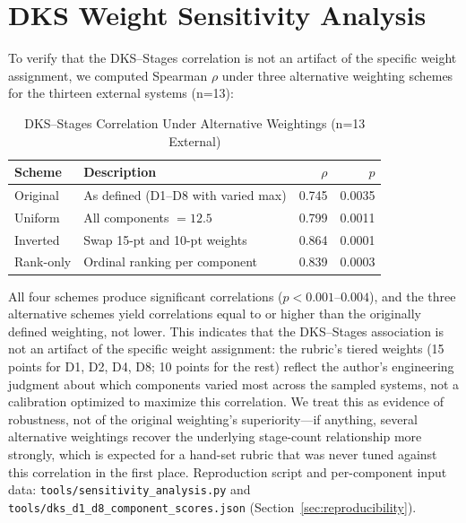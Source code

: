 \documentclass[10pt,a4paper]{article}
\begin{document}
\section{DKS Weight Sensitivity Analysis}
\label{sec:sensitivity}

To verify that the DKS--Stages correlation is not an artifact of the specific weight assignment, we computed Spearman $\rho$ under three alternative weighting schemes for the thirteen external systems (n=13):

\begin{table}[h]
\centering
\caption{DKS--Stages Correlation Under Alternative Weightings (n=13 External)}
\label{tab:sensitivity}
\begin{tabular}{@{}llrr@{}}
\toprule
\textbf{Scheme} & \textbf{Description} & \textbf{$\rho$} & \textbf{$p$} \\
\midrule
Original & As defined (D1--D8 with varied max) & 0.745 & 0.0035 \\
Uniform & All components $= 12.5$ & 0.799 & 0.0011 \\
Inverted & Swap 15-pt and 10-pt weights & 0.864 & 0.0001 \\
Rank-only & Ordinal ranking per component & 0.839 & 0.0003 \\
\bottomrule
\end{tabular}
\end{table}

All four schemes produce significant correlations ($p < 0.001$--$0.004$), and the three alternative schemes yield correlations equal to or higher than the originally defined weighting, not lower. This indicates that the DKS--Stages association is not an artifact of the specific weight assignment: the rubric's tiered weights (15 points for D1, D2, D4, D8; 10 points for the rest) reflect the author's engineering judgment about which components varied most across the sampled systems, not a calibration optimized to maximize this correlation. We treat this as evidence of robustness, not of the original weighting's superiority---if anything, several alternative weightings recover the underlying stage-count relationship more strongly, which is expected for a hand-set rubric that was never tuned against this correlation in the first place. Reproduction script and per-component input data: \texttt{tools/sensitivity\_analysis.py} and \texttt{tools/dks\_d1\_d8\_component\_scores.json} (Section~\ref{sec:reproducibility}).
\end{document}
